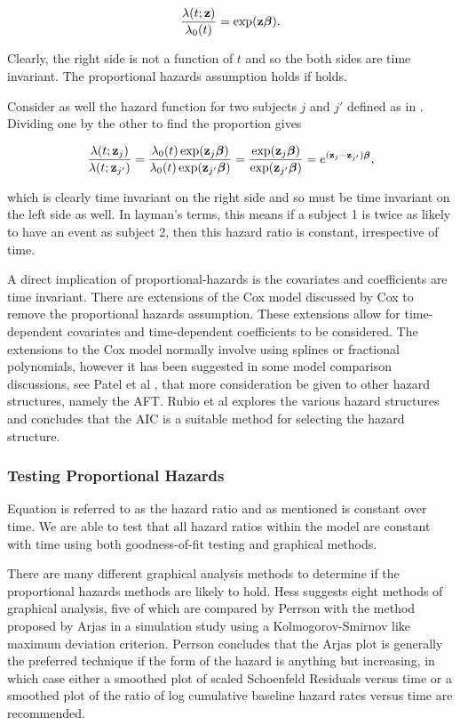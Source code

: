 \begin{equation}\label{prop-hazard}
    \frac{\lambda(t;\textbf{z})}{\lambda_0(t)}=\exp(\textbf{z}\boldsymbol{\beta}).
\end{equation}

Clearly, the right side is not a function of $t$ and so the both sides are time invariant. The proportional hazards assumption holds if  holds.

Consider as well the hazard function for two subjects $j$ and $j'$ defined as in . Dividing one by the other to find the proportion gives

\begin{equation}\label{hazard-ratio}
    \frac{\lambda(t;\textbf{z}_j)}{\lambda(t;\textbf{z}_{j'})} =\frac{\lambda_0(t)\exp(\textbf{z}_j\boldsymbol{\beta})}{\lambda_0(t)\exp(\textbf{z}_{j'}\boldsymbol{\beta})}=\frac{\exp(\textbf{z}_j\boldsymbol{\beta})}{\exp(\textbf{z}_{j'}\boldsymbol{\beta})}=e^{(\textbf{z}_j-\textbf{z}_{j'})\boldsymbol{\beta}},
\end{equation}

which is clearly time invariant on the right side and so must be time invariant on the left side as well. In layman's terms, this means if a subject 1 is twice as likely to have an event as subject 2, then this hazard ratio is constant, irrespective of time.

A direct implication of proportional-hazards is the covariates and coefficients are time invariant. There are extensions of the Cox model discussed by Cox  to remove the proportional hazards assumption. These extensions allow for time-dependent covariates and time-dependent coefficients to be considered. The extensions to the Cox model normally involve using splines or fractional polynomials, however it has been suggested in some model comparison discussions, see Patel et al , that more consideration be given to other hazard structures, namely the AFT. Rubio et al  explores the various hazard structures and concludes that the AIC is a suitable method for selecting the hazard structure.

\subsubsection{Testing Proportional Hazards}

Equation  is referred to as the hazard ratio and as mentioned is constant over time. We are able to test that all hazard ratios within the model are constant with time using both goodness-of-fit testing and graphical methods.

There are many different graphical analysis methods to determine if the proportional hazards methods are likely to hold. Hess  suggests eight methods of graphical analysis, five of which are compared by Perrson  with the method proposed by Arjas  in a simulation study using a Kolmogorov-Smirnov like maximum deviation criterion. Perrson  concludes that the Arjas plot is generally the preferred technique if the form of the hazard is anything but increasing, in which case either a smoothed plot of scaled
Schoenfeld Residuals versus time or a smoothed plot of the ratio of
log cumulative baseline hazard rates versus time are recommended.

